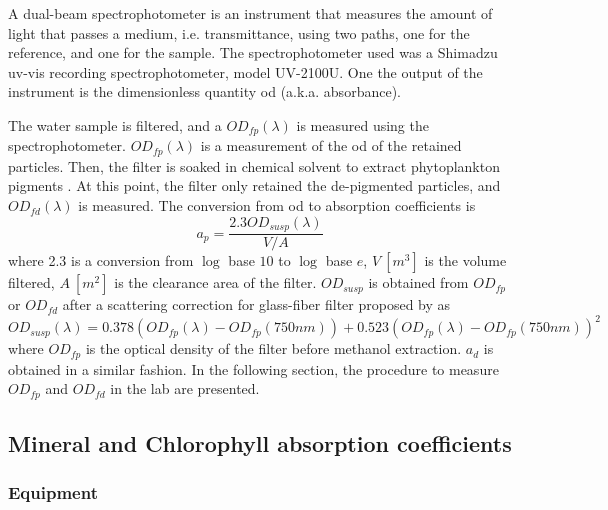 \begin{appendices}
A dual-beam spectrophotometer is an instrument that measures the amount of light that passes a medium, i.e. transmittance, using two paths, one for the reference, and one for the sample. The spectrophotometer used was a Shimadzu \gls{uv}-\gls{vis} recording spectrophotometer, model UV-2100U. One the output of the instrument is the dimensionless quantity \gls{od} (a.k.a. absorbance). 

The water sample is filtered, and a $OD_{fp}(\lambda)$ is measured using the spectrophotometer. $OD_{fp}(\lambda)$ is a measurement of the \gls{od} of the retained particles. Then, the filter is soaked in chemical solvent to extract phytoplankton pigments \citep{Kishino1985cj}. At this point, the filter only retained the de-pigmented particles, and $OD_{fd}(\lambda)$ is measured. The conversion from \gls{od} to absorption coefficients is \citep{Cleveland1993}
\begin{equation}
  a_p = \frac{\displaystyle 2.3 OD_{susp}(\lambda)}{V/A}
\end{equation}
\noindent where 2.3 is a conversion from $\log$ base $10$ to $\log$ base $e$, $V~[m^3]$ is the volume filtered, $A~[m^2]$ is the clearance area of the filter. $OD_{susp}$ is obtained from $OD_{fp}$ or $OD_{fd}$ after a scattering correction for glass-fiber filter proposed by \citet{Cleveland1993} as
\begin{equation}
   OD_{susp}(\lambda) = 0.378 (OD_{fp}(\lambda)-OD_{fp}(750nm)) + 0.523 (OD_{fp}(\lambda)-OD_{fp}(750nm))^2
 \end{equation} 
 \noindent where $OD_{fp}$ is the optical density of the filter before methanol extraction. $a_d$ is obtained in a similar fashion. In the following section, the procedure to measure $OD_{fp}$ and $OD_{fd}$ in the lab are presented.


\subsection{Mineral and Chlorophyll absorption coefficients}


\subsubsection{Equipment}

\end{appendices}
